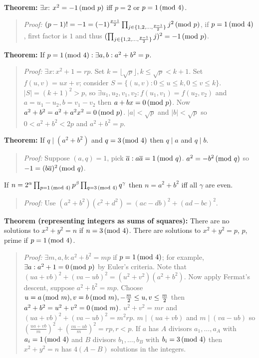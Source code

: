 {\bf Theorem:} $\exists x$: 
$x^2= -1 \thinspace \textnormal{(mod } p \textnormal{)}$ iff $p=2$ or $p= 1 \thinspace \textnormal{(mod } 4 \textnormal{)}$.
\begin{quote}
\emph{Proof:}
$(p-1)!= -1= (-1)^{\frac {p-1} 2} 
\prod_{j \in \{ 1,2, \ldots, {\frac {p-1} 2} \} } j^2 \thinspace \textnormal{(mod } p \textnormal{)}$,
if $p = 1 \thinspace \textnormal{(mod } 4 \textnormal{)}$, first factor is $1$ and thus
$(\prod_{j \in \{ 1,2, \ldots, {\frac {p-1} 2} \} } j)^2 = -1 \thinspace \textnormal{(mod } p \textnormal{)}$.
\end{quote}
{\bf Theorem:} 
If $p= 1 \thinspace \textnormal{(mod } 4 \textnormal{)}: \exists a,b: a^2+b^2=p$.  
\begin{quote}
\emph{Proof:} 
$\exists x: x^2+1= rp$.   Set
$k= \lfloor {\sqrt p} \rfloor, k \leq {\sqrt p} < k+1$.  Set $f(u,v)= ux+v$; consider
$S= \{(u,v): 0 \le u \le k, 0 \le v \le k \}$.  $|S|= (k+1)^2>p$, so 
$\exists u_1, u_2, v_1, v_2 : f(u_1,v_1)=f(u_2, v_2)$ and
$a= u_1-u_2, b= v_1-v_2$ then $a+bx=0 \thinspace \textnormal{(mod } p \textnormal{)}$.  Now $a^2+b^2 = a^2 + a^2 x^2 = 0 \thinspace \textnormal{(mod } p \textnormal{)}$.
$|a| < {\sqrt p}$ and
$|b| < {\sqrt p}$ so
$0<a^2 + b^2<2p$ and $a^2 + b^2= p$.
\end{quote}
{\bf Theorem:} 
If $q \mid (a^2 + b^2)$ and $q = 3 \thinspace \textnormal{(mod } 4 \textnormal{)}$ then $q \mid a$ and $q \mid b$.  
\begin{quote}
\emph{Proof:} 
Suppose $(a,q)=1$, pick ${\overline a}: a {\overline a} = 1 \thinspace \textnormal{(mod } q \textnormal{)}$.
$a^2 = -b^2 \thinspace \textnormal{(mod } q \textnormal{)}$ so $-1= (b {\overline a})^2 \thinspace \textnormal{(mod } q \textnormal{)}$.
\end{quote}
If $n= 2^{\alpha} \prod_{p = 1 \thinspace \textnormal{(mod } 4 \textnormal{)}} p^{\beta} \prod_{q = 3 \thinspace \textnormal{(mod } 4 \textnormal{)}} q^{\gamma}$ then
$n= a^2 + b^2$ iff all $\gamma$ are even.
\begin{quote}
\emph{Proof:} Use $(a^2 + b^2)(c^2 + d^2)=
(ac-db)^2 + (ad-bc)^2$.
\end{quote}
{\bf Theorem (representing integers as sums of squares):}
There are no solutions to $x^2 + y^2 =n$ if
$n= 3 \thinspace \textnormal{(mod } 4 \textnormal{)}$.  There are solutions to $x^2 + y^2 =p$, $p$, prime if
$p= 1 \thinspace \textnormal{(mod } 4 \textnormal{)}$.  
\begin{quote}
\emph{Proof:} $\exists m,a,b: a^2+b^2=mp$ if $p= 1 \thinspace \textnormal{(mod } 4 \textnormal{)}$; for
example, $\exists a: a^2+1 = 0 \thinspace \textnormal{(mod } p \textnormal{)}$ by Euler's criteria.  Note that
$(ua+vb)^2 + (va-ub)^2 = (u^2+v^2)(a^2+b^2)$.  Now apply Fermat's descent,
suppose $a^2+b^2=mp$.  Choose $u=a \thinspace \textnormal{(mod } m \textnormal{)}, v=b \thinspace \textnormal{(mod } m \textnormal{)}, -{\frac m 2} \le u,v \le {\frac m 2}$
then $a^2+b^2=u^2+v^2= 0 \thinspace \textnormal{(mod } m \textnormal{)}$.  $u^2+v^2= mr$ and
$(ua+vb)^2 + (va-ub)^2= m^2 rp$. $m \mid (ua+vb)$ and $m \mid (va-ub)$ so
$({\frac {ua+vb} {m}})^2 + ({\frac {va-ub} {m}})^2 =rp, r<p$.
If $a$ has $A$ divisors $a_1 , \ldots , a_A$ with $a_i = 1 \thinspace \textnormal{(mod } 4 \textnormal{)}$
and $B$ divisors $b_1 , \ldots , b_B$ with $b_i = 3 \thinspace \textnormal{(mod } 4 \textnormal{)}$ then
$x^2 + y^2 =n$ has $4(A-B)$ solutions in the integers.
\end{quote}
